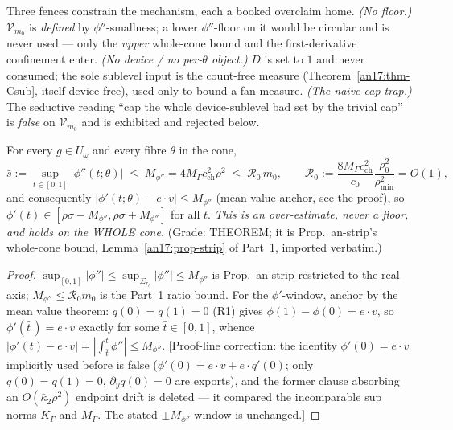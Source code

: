 Three fences constrain the mechanism, each a booked overclaim home. \emph{(No
floor.)} $\mathcal V_{m_0}$ is \emph{defined} by $\phi''$-smallness; a lower
$\phi''$-floor on it would be circular and is never used --- only the \emph{upper}
whole-cone bound and the first-derivative confinement enter. \emph{(No device / no
per-$\theta$ object.)} $D$ is set to $1$ and never consumed; the sole sublevel
input is the count-free measure (Theorem~\ref{an17:thm-Csub}, itself device-free),
used only to bound a fan-measure. \emph{(The naive-cap trap.)} The seductive
reading ``cap the whole device-sublevel bad set by the trivial cap'' is
\emph{false} on $\mathcal V_{m_0}$ and is exhibited and rejected below.

\begin{lemma}
\label{an17:lem-flat}
For every $g\in U_\omega$ and every fibre $\theta$ in the cone,
\begin{equation}\label{eq:an17-supbound}
 \bar s:=\sup_{t\in[0,1]}|\phi''(t;\theta)|\;\le\;M_{\phi''}=4M_\Gamma
 c_{\mathrm{ch}}^2\rho^2\;\le\;\mathcal R_0\,m_0,\qquad
 \mathcal R_0:=\frac{8M_\Gamma c_{\mathrm{ch}}^2}{c_0}\frac{\rho_0^2}{\rho_{\min}^2}
 =O(1),
\end{equation}
and consequently $|\phi'(t;\theta)-e\cdot v|\le M_{\phi''}$ (mean-value anchor,
see the proof), so
$\phi'(t)\in[\rho\sigma-M_{\phi''},\rho\sigma+M_{\phi''}]$ for all $t$. \emph{This
is an over-estimate, never a floor, and holds on the WHOLE cone.} {\rm(Grade:
THEOREM; it is Prop.~an-strip's whole-cone bound, Lemma~\ref{an17:prop-strip} of
Part~1, imported verbatim.)}
\end{lemma}
\begin{proof}
$\sup_{[0,1]}|\phi''|\le\sup_{\Sigma_{r_t}}|\phi''|\le M_{\phi''}$ is
Prop.~an-strip restricted to the real axis; $M_{\phi''}\le\mathcal R_0 m_0$ is the
Part~1 ratio bound. For the $\phi'$-window, anchor by the mean value theorem:
$q(0)=q(1)=0$ (R1) gives $\phi(1)-\phi(0)=e\cdot v$, so $\phi'(\bar t\,)=e\cdot v$
exactly for some $\bar t\in[0,1]$, whence $|\phi'(t)-e\cdot v|=
|\int_{\bar t}^{t}\phi''|\le M_{\phi''}$. \textup{[Proof-line correction: the
identity $\phi'(0)=e\cdot v$ implicitly used before is false ($\phi'(0)=e\cdot v
+e\cdot q'(0)$; only $q(0)=q(1)=0$, $\partial_yq(0)=0$ are exports), and the
former clause absorbing an $O(\bar\kappa_2\rho^2)$ endpoint drift is deleted ---
it compared the incomparable sup norms $K_\Gamma$ and $M_\Gamma$. The stated
$\pm M_{\phi''}$ window is unchanged.]}
\end{proof}

